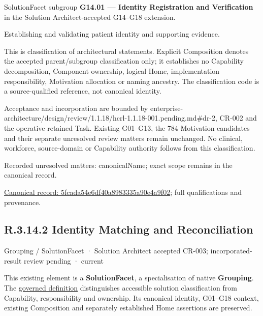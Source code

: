 SolutionFacet subgroup \textbf{G14.01 — Identity Registration and Verification} in the Solution Architect-accepted G14–G18 extension.



Establishing and validating patient identity and supporting evidence.



This is classification of architectural statements. Explicit Composition denotes the accepted parent/subgroup classification only; it establishes no Capability decomposition, Component ownership, logical Home, implementation responsibility, Motivation allocation or naming ancestry. The classification code is a source-qualified reference, not canonical identity.



Acceptance and incorporation are bounded by enterprise-architecture/design/review/1.1.18/hcrl-1.1.18-001.pending.md\#dr-2, CR-002 and the operative retained Task. Existing G01–G13, the 784 Motivation candidates and their separate unresolved review matters remain unchanged. No clinical, workforce, source-domain or Capability authority follows from this classification.


{\small Recorded unresolved matters: canonicalName; exact scope remains in the canonical record.}\par
{\footnotesize \href{../../../../../../../continuum/grouping/5fcada54e6df40a8983335a90e4a9f02.md}{Canonical record: 5fcada54e6df40a8983335a90e4a9f02}; full qualifications and provenance.}\par
\subsection*{R.3.14.2 Identity Matching and Reconciliation}
\label{navigation:R.3.14.2}

\label{element:b91ec2110aaf4d44bd043bb787fbd910}
{\small Grouping / SolutionFacet · Solution Architect accepted CR-003; incorporated-result review pending · current}\par

This existing element is a \textbf{SolutionFacet}, a specialisation of native
\textbf{Grouping}. The \href{\detokenize{../../../../../../../governance/continuum-representation.md#solutionfacet-classification--1119-candidate}}{governed definition}
distinguishes accessible solution classification from Capability, responsibility
and ownership. Its canonical identity, G01–G18 context, existing Composition
and separately established Home assertions are preserved.



